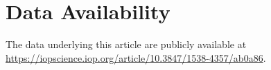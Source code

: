 \documentclass[fleqn,usenatbib,useAMS]{mnras}
\begin{document}
  \section{Data Availability}
  The data underlying this article are publicly available at \url{https://iopscience.iop.org/article/10.3847/1538-4357/ab0a86}. 















\bsp	%
\label{lastpage}
\end{document}

